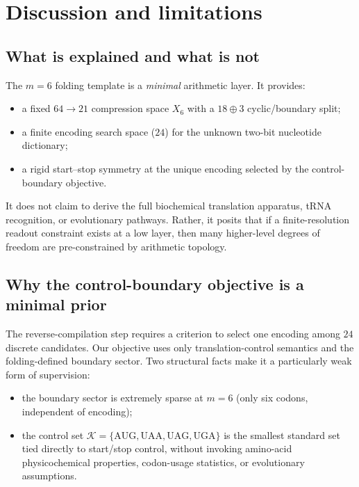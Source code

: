 \section{Discussion and limitations}
\label{sec:discussion}

\subsection{What is explained and what is not}
\label{sec:what_explained}

The $m=6$ folding template is a \emph{minimal} arithmetic layer.
It provides:
\begin{itemize}
\item a fixed $64\to 21$ compression space $X_6$ with a $18\oplus 3$ cyclic/boundary split;
\item a finite encoding search space ($24$) for the unknown two-bit nucleotide dictionary;
\item a rigid start--stop symmetry at the unique encoding selected by the control-boundary objective.
\end{itemize}

It does not claim to derive the full biochemical translation apparatus, tRNA recognition, or evolutionary pathways.
Rather, it posits that if a finite-resolution readout constraint exists at a low layer, then many higher-level degrees of freedom are pre-constrained by arithmetic topology.

\subsection{Why the control-boundary objective is a minimal prior}
\label{sec:why_control_objective}

The reverse-compilation step requires a criterion to select one encoding among $24$ discrete candidates.
Our objective uses only translation-control semantics and the folding-defined boundary sector.
Two structural facts make it a particularly weak form of supervision:
\begin{itemize}
\item the boundary sector is extremely sparse at $m=6$ (only six codons, independent of encoding);
\item the control set $\mathcal{K}=\{\mathrm{AUG,UAA,UAG,UGA}\}$ is the smallest standard set tied directly to start/stop control, without invoking amino-acid physicochemical properties, codon-usage statistics, or evolutionary assumptions.
\end{itemize}

